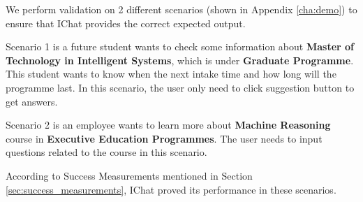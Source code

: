 We perform validation on 2 different scenarios (shown in Appendix \ref{cha:demo}) to ensure that IChat provides the correct expected output.

Scenario 1 is a future student wants to check some information about \textbf{Master of Technology in Intelligent Systems}, which is under \textbf{Graduate Programme}. This student wants to know when the next intake time and how long will the programme last. In this scenario, the user only need to click suggestion button to get answers.

Scenario 2 is an employee wants to learn more about \textbf{Machine Reasoning} course in \textbf{Executive Education Programmes}. The user needs to input questions related to the course in this scenario.

According to Success Measurements mentioned in Section \ref{sec:success_measurements}, IChat proved its performance in these scenarios.